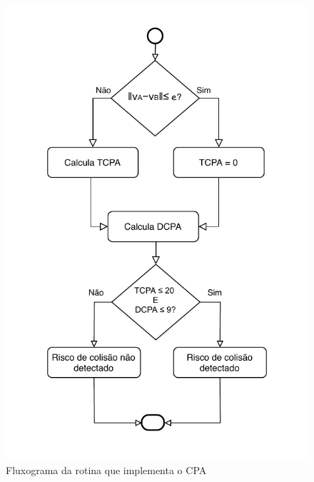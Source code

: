     \begin{figure}
        \centering
        \includegraphics{fig/chap4/fluxograma_cpa.pdf}
        \caption{Fluxograma da rotina que implementa o CPA}
        \label{fig:chap4_fluxograma_cpa}
    \end{figure}
    
